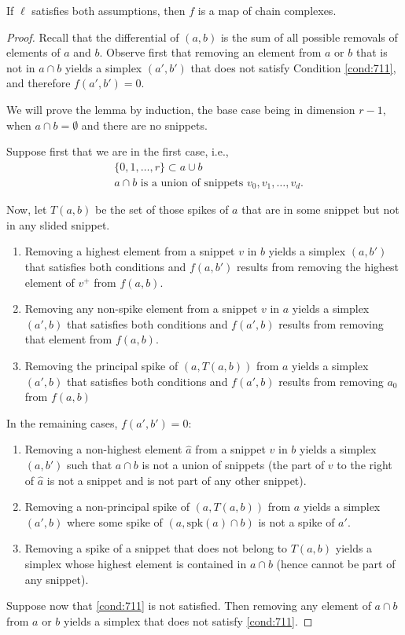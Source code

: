 \begin{lemma}
	If $\ell$ satisfies both assumptions, then $f$ is a map of chain complexes.
\end{lemma}

\begin{proof}
	Recall that the differential of $(a,b)$ is the sum of all possible removals of elements of $a$ and $b$. Observe first that removing an element from $a$ or $b$ that is not in $a\cap b$ yields a simplex $(a',b')$ that does not satisfy Condition \eqref{cond:711}, and therefore $f(a',b') = 0$.

	We will prove the lemma by induction, the base case being in dimension $r-1$, when $a\cap b = \emptyset$ and there are no snippets.

	Suppose first that we are in the first case, i.e.,
	\begin{align}\label{cond:711}
		&\{0,1,\ldots,r\}\subset a\cup b \\ \label{cond:712}
		&a\cap b\text{ is a union of snippets }v_0,v_1,\ldots,v_d.
	\end{align}

	Now, let $T(a,b)$ be the set of those spikes of $a$ that are in some snippet but not in any slided snippet.
	\begin{enumerate}
		\item Removing a highest element from a snippet $v$ in $b$ yields a simplex $(a,b')$ that satisfies both conditions and $f(a,b')$ results from removing the highest element of $v^+$ from $f(a,b)$.
		\item Removing any non-spike element from a snippet $v$ in $a$ yields a simplex $(a',b)$ that satisfies both conditions and $f(a',b)$ results from removing that element from $f(a,b)$.
		\item Removing the principal spike of $(a,T(a,b))$ from $a$ yields a simplex $(a',b)$ that satisfies both conditions and $f(a',b)$ results from removing $a_0$ from $f(a,b)$
	\end{enumerate}
	In the remaining cases, $f(a',b')=0$:
	\begin{enumerate}
		\item Removing a non-highest element $\hat{a}$ from a snippet $v$ in $b$ yields a simplex $(a,b')$ such that $a\cap b$ is not a union of snippets (the part of $v$ to the right of $\hat{a}$ is not a snippet and is not part of any other snippet).
		\item Removing a non-principal spike of $(a,T(a,b))$ from $a$ yields a simplex $(a',b)$ where some spike of $(a,\mathrm{spk}(a)\cap b)$ is not a spike of $a'$.
		\item Removing a spike of a snippet that does not belong to $T(a,b)$ yields a simplex whose highest element is contained in $a\cap b$ (hence cannot be part of any snippet).
	\end{enumerate}
	Suppose now that \eqref{cond:711} is not satisfied. Then removing any element of $a\cap b$ from $a$ or $b$ yields a simplex that does not satisfy \eqref{cond:711}.


\end{proof}
